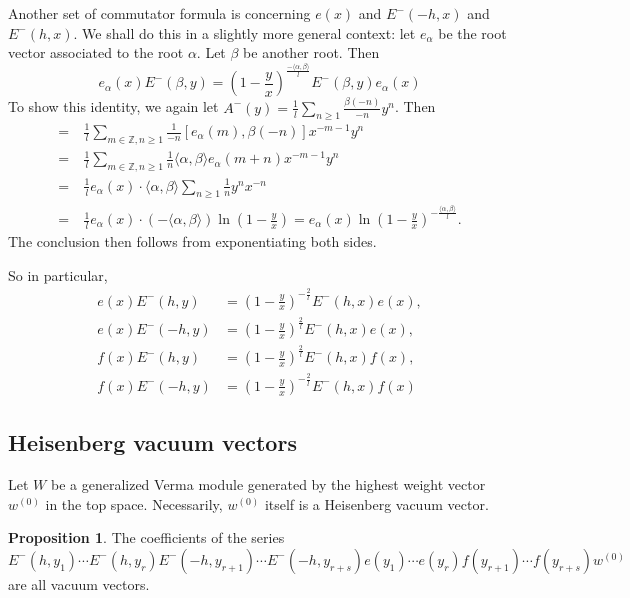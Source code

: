 \documentclass[11pt,oneside,reqno]{amsart}
\theoremstyle{definition}
\newtheorem{prop}[theorem]{Proposition}
\newcommand{\Z}{{\mathbb Z}}
\begin{document}
Another set of commutator formula is concerning $e(x)$ and $E^-(-h, x)$ and $E^-(h, x)$. We shall do this in a slightly more general context: let $e_\alpha$ be the root vector associated to the root $\alpha$. Let $\beta$ be another root. Then $$e_\alpha(x)E^-(\beta,y) = \left(1-\frac y x\right)^{\frac{-\langle \alpha, \beta\rangle}{l}}E^-(\beta,y)e_\alpha(x)$$
To show this identity, we again let $A^-(y) = \frac 1 l \sum_{n\geq 1} \frac{\beta(-n)}{-n}y^{n}$. Then 
\begin{align*}
    [e_\alpha(x), A^-(y)] = \ & \frac 1 l\sum_{m\in \Z, n \geq 1} \frac 1 {-n}[e_\alpha(m), \beta(-n)] x^{-m-1}y^n\\
    =\ &\frac 1 l \sum_{m\in \Z, n \geq 1} \frac 1 {n} \langle \alpha, \beta\rangle e_\alpha(m+n) x^{-m-1}y^n \\
    =\ & \frac 1 le_\alpha(x)\cdot \langle \alpha, \beta\rangle \sum_{n\geq 1} \frac 1 n y^n x^{-n}\\
    = \ & \frac 1 le_\alpha(x) \cdot \left(-\langle \alpha, \beta\rangle \right)\ln\left(1-\frac y x\right) = e_\alpha(x) \ln\left(1-\frac y x\right)^{-\frac {\langle \alpha, \beta\rangle} l}. 
\end{align*}
The conclusion then follows from exponentiating both sides. 

So in particular, 
\begin{align*}
    e(x)E^-(h,y) &= \left(1- \frac y x\right)^{-\frac 2 l}E^-(h,x)e(x), \\
    e(x)E^-(-h,y) &= \left(1- \frac y x\right)^{\frac 2 l}E^-(h,x)e(x),\\
    f(x)E^-(h,y) &= \left(1- \frac y x\right)^{\frac 2 l}E^-(h,x)f(x), \\
    f(x)E^-(-h,y) &= \left(1- \frac y x\right)^{-\frac 2 l}E^-(h,x)f(x)
\end{align*}

\subsection{Heisenberg vacuum vectors} Let $W$ be a generalized Verma module generated by the highest weight vector $w^{(0)}$ in the top space. Necessarily, $w^{(0)}$ itself is a Heisenberg vacuum vector. 

\begin{prop}
    The coefficients of the series
    $$E^-(h, y_1)\cdots E^-(h,y_r) E^-(-h, y_{r+1}) \cdots E^-(-h, y_{r+s}) e(y_1)\cdots e(y_r) f(y_{r+1}) \cdots f(y_{r+s})w^{(0)}$$
    are all vacuum vectors. 
\end{prop}
\end{document}
